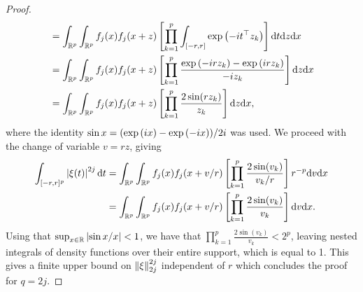 \begin{proof}
\begin{align*}
        &= \intRp{x}{\intRp{z}{f_j(x)f_j(x + z)\left[\prod_{k=1}^p \int_{[-r, r]}\expf{-it^\top z_k}\right]\d t}}\\
        &= \intRp{x}{\intRp{z}{f_j(x)f_j(x + z)\left[\prod_{k=1}^p \frac{\expf{-irz_k} - \expf{irz_k}}{-iz_k} \right]}}\\
        &= \intRp{x}{\intRp{z}{f_j(x)f_j(x + z)\left[\prod_{k=1}^p \frac{2 \sin(rz_k)}{z_k} \right]}},
    \end{align*}
    where the identity $\sin x = (\expf{ix} - \expf{-ix}) / 2i$ was used. We proceed with the change of variable $v = r z$, giving
    \begin{align*}
        \int_{[-r, r]^p} \abs{\xi(t)}^{2j} \d t
        &= \intRp{x}{\intRp{v}{f_j(x)f_j(x + v/r)\left[\prod_{k=1}^p \frac{2 \sin(v_k)}{v_k/r} \right] r^{-p}}}\\
        &= \intRp{x}{\intRp{v}{f_j(x)f_j(x + v/r)\left[\prod_{k=1}^p \frac{2 \sin(v_k)}{v_k} \right]}}.
    \end{align*}
    Using that $\sup_{x \in \R} \abs{\sin x / x} < 1$, we have that $\prod_{k=1}^p \frac{2 \sin(v_k)}{v_k} < 2^p$, leaving nested integrals of density functions over their entire support, which is equal to 1. This gives a finite upper bound on $\norm{\xi}_{2j}^{2j}$ independent of $r$ which concludes the proof for $q = 2j$.
\end{proof}